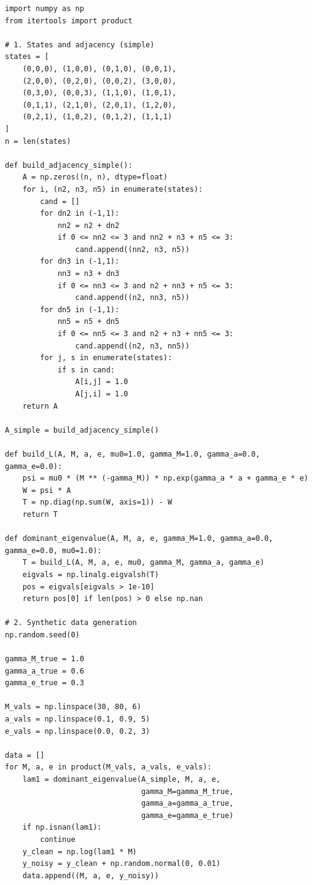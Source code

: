 \documentclass[11pt]{article}
\begin{document}
\begin{verbatim}
import numpy as np
from itertools import product

# 1. States and adjacency (simple)
states = [
    (0,0,0), (1,0,0), (0,1,0), (0,0,1),
    (2,0,0), (0,2,0), (0,0,2), (3,0,0),
    (0,3,0), (0,0,3), (1,1,0), (1,0,1),
    (0,1,1), (2,1,0), (2,0,1), (1,2,0),
    (0,2,1), (1,0,2), (0,1,2), (1,1,1)
]
n = len(states)

def build_adjacency_simple():
    A = np.zeros((n, n), dtype=float)
    for i, (n2, n3, n5) in enumerate(states):
        cand = []
        for dn2 in (-1,1):
            nn2 = n2 + dn2
            if 0 <= nn2 <= 3 and nn2 + n3 + n5 <= 3:
                cand.append((nn2, n3, n5))
        for dn3 in (-1,1):
            nn3 = n3 + dn3
            if 0 <= nn3 <= 3 and n2 + nn3 + n5 <= 3:
                cand.append((n2, nn3, n5))
        for dn5 in (-1,1):
            nn5 = n5 + dn5
            if 0 <= nn5 <= 3 and n2 + n3 + nn5 <= 3:
                cand.append((n2, n3, nn5))
        for j, s in enumerate(states):
            if s in cand:
                A[i,j] = 1.0
                A[j,i] = 1.0
    return A

A_simple = build_adjacency_simple()

def build_L(A, M, a, e, mu0=1.0, gamma_M=1.0, gamma_a=0.0, gamma_e=0.0):
    psi = mu0 * (M ** (-gamma_M)) * np.exp(gamma_a * a + gamma_e * e)
    W = psi * A
    T = np.diag(np.sum(W, axis=1)) - W
    return T

def dominant_eigenvalue(A, M, a, e, gamma_M=1.0, gamma_a=0.0, gamma_e=0.0, mu0=1.0):
    T = build_L(A, M, a, e, mu0, gamma_M, gamma_a, gamma_e)
    eigvals = np.linalg.eigvalsh(T)
    pos = eigvals[eigvals > 1e-10]
    return pos[0] if len(pos) > 0 else np.nan

# 2. Synthetic data generation
np.random.seed(0)

gamma_M_true = 1.0
gamma_a_true = 0.6
gamma_e_true = 0.3

M_vals = np.linspace(30, 80, 6)
a_vals = np.linspace(0.1, 0.9, 5)
e_vals = np.linspace(0.0, 0.2, 3)

data = []
for M, a, e in product(M_vals, a_vals, e_vals):
    lam1 = dominant_eigenvalue(A_simple, M, a, e,
                               gamma_M=gamma_M_true,
                               gamma_a=gamma_a_true,
                               gamma_e=gamma_e_true)
    if np.isnan(lam1):
        continue
    y_clean = np.log(lam1 * M)
    y_noisy = y_clean + np.random.normal(0, 0.01)
    data.append((M, a, e, y_noisy))


\end{verbatim}
\end{document}
